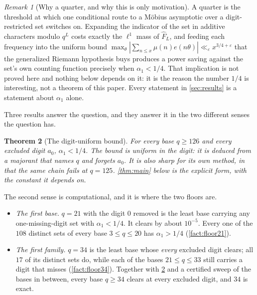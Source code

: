 \documentclass[11pt]{amsart}
\newtheorem{theorem}{Theorem}[section]
\theoremstyle{definition}
\theoremstyle{remark}
\newtheorem{remark}[theorem]{Remark}
\begin{document}
\begin{remark}[Why a quarter, and why this is only motivation]
\label{rem:motive}
A quarter is the threshold at which one conditional route to a M\"obius asymptotic over a digit-restricted set switches on. Expanding the indicator of the set in additive characters modulo $q^{L}$ costs exactly the $\ell^{1}$ mass of $\widehat{F}_{L}$, and feeding each frequency into the uniform bound $\max_{\theta}|\sum_{n \le x}\mu(n)e(n\theta)| \ll_{\varepsilon} x^{3/4+\varepsilon}$ that the generalized Riemann hypothesis buys \cite{bh91} produces a power saving against the set's own counting function precisely when $\alpha_{1} < 1/4$. That implication is not proved here and nothing below depends on it: it is the reason the number $1/4$ is interesting, not a theorem of this paper. Every statement in \cref{sec:results} is a statement about $\alpha_{1}$ alone.
\end{remark}

Three results answer the question, and they answer it in the two different senses the question has.

\begin{theorem}[The digit-uniform bound]
\label{thm:main0}
For every base $q \ge 126$ and every excluded digit $a_{0}$, $\alpha_{1} < 1/4$. The bound is uniform in the digit: it is deduced from a majorant that names $q$ and forgets $a_{0}$. It is also sharp for its own method, in that the same chain fails at $q = 125$. \cref{thm:main} below is the explicit form, with the constant it depends on.
\end{theorem}

The second sense is computational, and it is where the two floors are.

\begin{itemize}
\item \emph{The first base.} $q = 21$ with the digit $0$ removed is the least base carrying any one-missing-digit set with $\alpha_{1} < 1/4$. It clears by about $10^{-5}$. Every one of the $108$ distinct sets of every base $3 \le q \le 20$ has $\alpha_{1} > 1/4$ (\cref{fact:floor21}).
\item \emph{The first family.} $q = 34$ is the least base whose \emph{every} excluded digit clears; all $17$ of its distinct sets do, while each of the bases $21 \le q \le 33$ still carries a digit that misses (\cref{fact:floor34}). Together with \cref{thm:main0} and a certified sweep of the bases in between, every base $q \ge 34$ clears at every excluded digit, and $34$ is exact.
\end{itemize}
\end{document}
